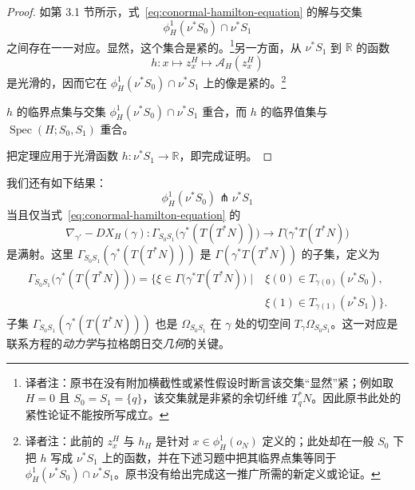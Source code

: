\begin{proof}
如第 3.1 节所示，式~\eqref{eq:conormal-hamilton-equation} 的解与交集
\[
  \phi_H^1(\nu^*S_0)\cap\nu^*S_1
\]
之间存在一一对应。显然，这个集合是紧的。\footnote{译者注：原书在没有附加横截性或紧性假设时断言该交集“显然”紧；例如取 $H=0$ 且 $S_0=S_1=\{q\}$，该交集就是非紧的余切纤维 $T_q^*N$。因此原书此处的紧性论证不能按所写成立。}另一方面，从 $\nu^*S_1$ 到 $\mathbb R$ 的函数
\[
  h:x\longmapsto z_x^H\longmapsto\mathcal A_H(z_x^H)
\]
是光滑的，因而它在 $\phi_H^1(\nu^*S_0)\cap\nu^*S_1$ 上的像是紧的。\footnote{译者注：此前的 $z_x^H$ 与 $h_H$ 是针对 $x\in\phi_H^1(o_N)$ 定义的；此处却在一般 $S_0$ 下把 $h$ 写成 $\nu^*S_1$ 上的函数，并在下述习题中把其临界点集等同于 $\phi_H^1(\nu^*S_0)\cap\nu^*S_1$。原书没有给出完成这一推广所需的新定义或论证。}

\begin{exercise}
\label{ex:critical-points-basic-function}
$h$ 的临界点集与交集 $\phi_H^1(\nu^*S_0)\cap\nu^*S_1$ 重合，而 $h$ 的临界值集与 $\operatorname{Spec}(H;S_0,S_1)$ 重合。
\end{exercise}

把\personSard{}定理应用于光滑函数 $h:\nu^*S_1\to\mathbb R$，即完成证明。
\end{proof}

我们还有如下\termTransversality{}结果：
\[
  \phi_H^1(\nu^*S_0)\pitchfork\nu^*S_1
\]
当且仅当式~\eqref{eq:conormal-hamilton-equation} 的\termLinearizationOperator{}
\begin{equation}
  \nabla_{\gamma'}-DX_H(\gamma):
  \Gamma_{S_0S_1}\bigl(\gamma^*(T(T^*N))\bigr)
  \longrightarrow
  \Gamma\bigl(\gamma^*T(T^*N)\bigr)
  \label{eq:conormal-linearization}
\end{equation}
是满射。这里 $\Gamma_{S_0S_1}(\gamma^*(T(T^*N)))$ 是 $\Gamma(\gamma^*T(T^*N))$ 的子集，定义为
\[
\begin{split}
  \Gamma_{S_0S_1}\bigl(\gamma^*(T(T^*N))\bigr)
  =\{\xi\in\Gamma\bigl(\gamma^*T(T^*N)\bigr)\mid{}&
    \xi(0)\in T_{\gamma(0)}(\nu^*S_0),\\
   &\xi(1)\in T_{\gamma(1)}(\nu^*S_1)\}.
\end{split}
\]
子集 $\Gamma_{S_0S_1}(\gamma^*(T(T^*N)))$ 也是 $\Omega_{S_0S_1}$ 在 $\gamma$ 处的切空间 $T_\gamma\Omega_{S_0S_1}$。这一对应是联系\personHamilton{}方程的\emph{动力学}与拉格朗日交\emph{几何}的关键。

